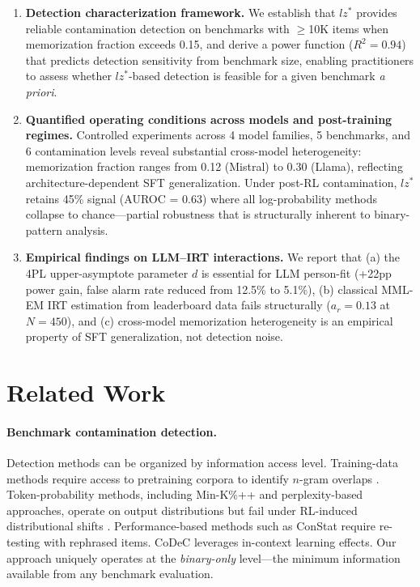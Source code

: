 \documentclass[11pt]{article}
\begin{document}
\begin{enumerate}
    \item \textbf{Detection characterization framework.}
    We establish that $lz^*$ provides reliable contamination detection on benchmarks with $\geq$10K items when memorization fraction exceeds 0.15, and derive a power function ($R^2 = 0.94$) that predicts detection sensitivity from benchmark size, enabling practitioners to assess whether $lz^*$-based detection is feasible for a given benchmark \emph{a priori}.

    \item \textbf{Quantified operating conditions across models and post-training regimes.}
    Controlled experiments across 4 model families, 5 benchmarks, and 6 contamination levels reveal substantial cross-model heterogeneity: memorization fraction ranges from 0.12 (Mistral) to 0.30 (Llama), reflecting architecture-dependent SFT generalization.
    Under post-RL contamination, $lz^*$ retains 45\% signal (AUROC = 0.63) where all log-probability methods collapse to chance---partial robustness that is structurally inherent to binary-pattern analysis.

    \item \textbf{Empirical findings on LLM--IRT interactions.}
    We report that (a) the 4PL upper-asymptote parameter $d$ is essential for LLM person-fit (+22pp power gain, false alarm rate reduced from 12.5\% to 5.1\%), (b) classical MML-EM IRT estimation from leaderboard data fails structurally ($a_r = 0.13$ at $N = 450$), and (c) cross-model memorization heterogeneity is an empirical property of SFT generalization, not detection noise.
\end{enumerate}

\section{Related Work}
\label{sec:related}

\paragraph{Benchmark contamination detection.}
Detection methods can be organized by information access level.
Training-data methods require access to pretraining corpora to identify $n$-gram overlaps \citep{brown2020language,dodge2021documenting}.
Token-probability methods, including Min-K\%++ \citep{shi2024detecting} and perplexity-based approaches, operate on output distributions but fail under RL-induced distributional shifts \citep{wang2025rl}.
Performance-based methods such as ConStat \citep{dekoninck2024constat} require re-testing with rephrased items.
CoDeC \citep{codec2026} leverages in-context learning effects.
Our approach uniquely operates at the \emph{binary-only} level---the minimum information available from any benchmark evaluation.
\end{document}
